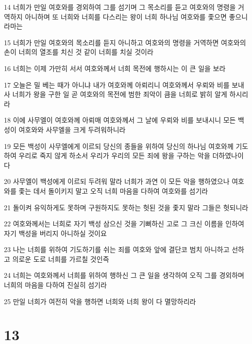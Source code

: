 \par 14 너희가 만일 여호와를 경외하여 그를 섬기며 그 목소리를 듣고 여호와의 명령을 거역하지 아니하며 또 너희와 너희를 다스리는 왕이 너희 하나님 여호와를 좇으면 좋으니라마는
\par 15 너희가 만일 여호와의 목소리를 듣지 아니하고 여호와의 명령을 거역하면 여호와의 손이 너희의 열조를 치신 것 같이 너희를 치실 것이라
\par 16 너희는 이제 가만히 서서 여호와께서 너희 목전에 행하시는 이 큰 일을 보라
\par 17 오늘은 밀 베는 때가 아니냐 내가 여호와께 아뢰리니 여호와께서 우뢰와 비를 보내사 너희가 왕을 구한 일 곧 여호와의 목전에 범한 죄악이 큼을 너희로 밝히 알게 하시리라
\par 18 이에 사무엘이 여호와께 아뢰매 여호와께서 그 날에 우뢰와 비를 보내시니 모든 백성이 여호와와 사무엘을 크게 두려워하니라
\par 19 모든 백성이 사무엘에게 이르되 당신의 종들을 위하여 당신의 하나님 여호와께 기도하여 우리로 죽지 않게 하소서 우리가 우리의 모든 죄에 왕을 구하는 악을 더하였나이다
\par 20 사무엘이 백성에게 이르되 두려워 말라 너희가 과연 이 모든 악을 행하였으나 여호와를 좇는 데서 돌이키지 말고 오직 너희 마음을 다하여 여호와를 섬기라
\par 21 돌이켜 유익하게도 못하며 구원하지도 못하는 헛된 것을 좇지 말라 그들은 헛되니라
\par 22 여호와께서는 너희로 자기 백성 삼으신 것을 기뻐하신 고로 그 크신 이름을 인하여 자기 백성을 버리지 아니하실 것이요
\par 23 나는 너희를 위하여 기도하기를 쉬는 죄를 여호와 앞에 결단코 범치 아니하고 선하고 의로운 도로 너희를 가르칠 것인즉
\par 24 너희는 여호와께서 너희를 위하여 행하신 그 큰 일을 생각하여 오직 그를 경외하며 너희의 마음을 다하여 진실히 섬기라
\par 25 만일 너희가 여전히 악을 행하면 너희와 너희 왕이 다 멸망하리라

\chapter{13}

